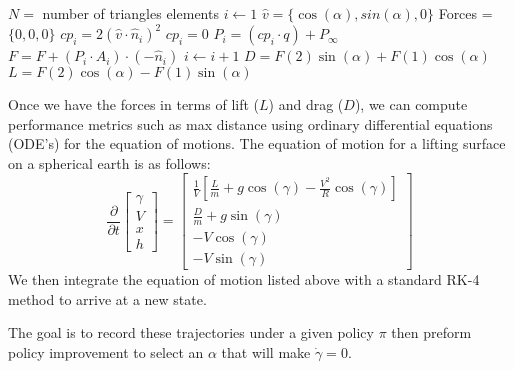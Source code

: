 \documentclass[12pt]{report} %
\begin{document}
\begin{algorithmic}
    \State $N =$ number of triangles elements
        \State $i \gets 1$
    \State $\hat{v} =\{\cos(\alpha),sin(\alpha),0\} $
    \State Forces =$\{0,0,0\} $
        \State  ${cp}_i = 2 \left(\hat{v} \cdot \hat{n}_i\right)^2$
    \Else
        \State  ${cp}_i = 0$ 
    \EndIf
    \State  $P_i=({cp}_i \cdot q)+P_{\infty}$
    \State  $F = F + (P_i \cdot A_i)\cdot(-\hat{n}_i) $
    \State $i \gets i+1$
    \EndWhile
    \State  $D=F(2)\sin(\alpha)+F(1)\cos(\alpha)$
    \State  $L=F(2)\cos(\alpha)-F(1)\sin(\alpha)$
    \EndProcedure
\end{algorithmic}
Once we have the forces in terms of lift ($L$) and drag ($D$), we can compute performance metrics such as max distance using 
ordinary differential equations (ODE's) for the equation of motions. The equation of motion for a lifting surface on a spherical earth
is as follows:
\begin{equation}
    \frac{\partial}{\partial t}
    \begin{bmatrix}
        \gamma \\
        V \\
        x \\
        h 
    \end{bmatrix} =
    \begin{bmatrix}
        \frac{1}{V} \left[\frac{L}{m}+g \cos(\gamma)-\frac{V^2}{R} \cos(\gamma)\right] \\
        \frac{D}{m}+ g\sin(\gamma)\\
        -V\cos(\gamma) \\
        -V\sin(\gamma)
    \end{bmatrix}
        \end{equation}
We then integrate the equation of motion listed above with a standard RK-4 method to arrive at a new state.

The goal is to record these trajectories under a given policy $\pi$ then preform policy improvement to select an $\alpha$ that will make $\dot{\gamma} = 0$.
\end{document}

